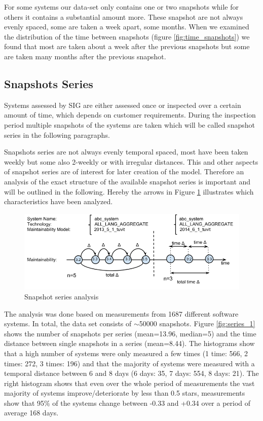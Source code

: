 For some systems our data-set only contains one or two snapshots while for others it contains a substantial amount more. These snapshot are not always evenly spaced, some are taken a week apart, some months. When we examined the distribution of the time between snapshots (figure \ref{fig:time_snapshots}) we found that most are taken about a week after the previous snapshots but some are taken many months after the previous snapshot.

\subsection{Snapshots Series}
Systems assessed by SIG are either assessed once or inspected over a certain amount of time, which depends on customer requirements. During the inspection period multiple snapshots of the systems are taken which will be called snapshot series in the following paragraphs.

Snapshots series are not always evenly temporal spaced, most have been taken weekly but some also 2-weekly or with irregular distances. This and other aspects of snapshot series are of interest for later creation of the model. 
Therefore an analysis of the exact structure of the available snapshot series is important and will be outlined in the following. Hereby the arrows in Figure \ref{fig:schema} illustrates which characteristics have been analyzed.

\begin{figure}[!htb]
  \centering
  \includegraphics[width=0.8\linewidth]{figs/analysis_schema.png}
  \caption{Snapshot series analysis}
  \label{fig:schema}
\end{figure}

The analysis was done based on measurements from 1687 different software systems. In total, the data set consists of $\sim$50000 snapshots. Figure \ref{fig:series_1} shows the number of snapshots per series (mean=13.96, median=5) and the time distance between single snapshots in a series (mean=8.44). The histograms show that a high number of systems were only measured a few times (1 time: 566, 2 times: 272, 3 times: 196) and that the majority of systems were measured with a temporal distance between 6 and 8 days (6 days: 35, 7 days: 554, 8 days: 21). The right histogram shows that even over the whole period of measurements the vast majority of systems improve/deteriorate by less than 0.5 stars, measurements show that 95\% of the systems change between -0.33 and +0.34 over a period of average 168 days.

